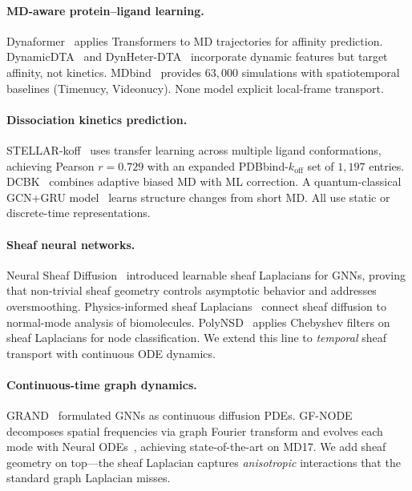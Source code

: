 \documentclass{article}
\begin{document}
\paragraph{MD-aware protein--ligand learning.}
Dynaformer~\citep{lu2024dynaformer} applies Transformers to MD
trajectories for affinity prediction.
DynamicDTA~\citep{yang2025dynamicdta} and
DynHeter-DTA~\citep{chen2025dynheterdta} incorporate dynamic features
but target affinity, not kinetics.
MDbind~\citep{zheng2025mdbind} provides $63{,}000$ simulations with
spatiotemporal baselines (Timenucy, Videonucy).
None model explicit local-frame transport.

\paragraph{Dissociation kinetics prediction.}
STELLAR-koff~\citep{liu2025stellar} uses transfer learning across
multiple ligand conformations, achieving Pearson $r{=}0.729$ with an
expanded PDBbind-$k_\text{off}$ set of $1{,}197$ entries.
DCBK~\citep{kokh2025dcbk} combines adaptive biased MD with ML
correction.
A quantum-classical GCN+GRU model~\citep{lee2025quantumgcn} learns
structure changes from short MD.
All use static or discrete-time representations.

\paragraph{Sheaf neural networks.}
Neural Sheaf Diffusion~\citep{bodnar2022neural} introduced learnable
sheaf Laplacians for GNNs, proving that non-trivial sheaf geometry
controls asymptotic behavior and addresses oversmoothing.
Physics-informed sheaf Laplacians~\citep{chen2025physicssheaf} connect
sheaf diffusion to normal-mode analysis of biomolecules.
PolyNSD~\citep{li2025polynsd} applies Chebyshev filters on sheaf
Laplacians for node classification.
We extend this line to \emph{temporal} sheaf transport with continuous
ODE dynamics.

\paragraph{Continuous-time graph dynamics.}
GRAND~\citep{chamberlain2021grand} formulated GNNs as continuous
diffusion PDEs.
GF-NODE~\citep{tsolis2024gfnode} decomposes spatial frequencies via
graph Fourier transform and evolves each mode with Neural
ODEs~\citep{chen2018neural}, achieving state-of-the-art on MD17.
We add sheaf geometry on top---the sheaf Laplacian captures
\emph{anisotropic} interactions that the standard graph Laplacian
misses.
\end{document}
